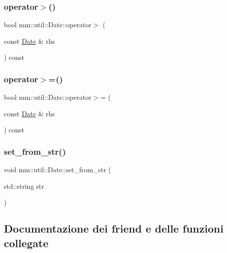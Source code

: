 \subsubsection{\texorpdfstring{operator$>$()}{operator>()}}
{\footnotesize\ttfamily bool mm\+::util\+::\+Date\+::operator$>$ (\begin{DoxyParamCaption}\item[{const \hyperlink{structmm_1_1util_1_1_date}{Date} \&}]{rhs }\end{DoxyParamCaption}) const}

\mbox{\label{structmm_1_1util_1_1_date_ab0dc9872f7646c748d492afcff696a0d}} 
\subsubsection{\texorpdfstring{operator$>$=()}{operator>=()}}
{\footnotesize\ttfamily bool mm\+::util\+::\+Date\+::operator$>$= (\begin{DoxyParamCaption}\item[{const \hyperlink{structmm_1_1util_1_1_date}{Date} \&}]{rhs }\end{DoxyParamCaption}) const}

\mbox{\label{structmm_1_1util_1_1_date_a9140b9c53f02f7385af15684c81c5ed0}} 
\subsubsection{\texorpdfstring{set\+\_\+from\+\_\+str()}{set\_from\_str()}}
{\footnotesize\ttfamily void mm\+::util\+::\+Date\+::set\+\_\+from\+\_\+str (\begin{DoxyParamCaption}\item[{std\+::string}]{str }\end{DoxyParamCaption})}



\subsection{Documentazione dei friend e delle funzioni collegate}
\mbox{\label{structmm_1_1util_1_1_date_a1862604492a841a6b98e1a3061d95b96}} 
